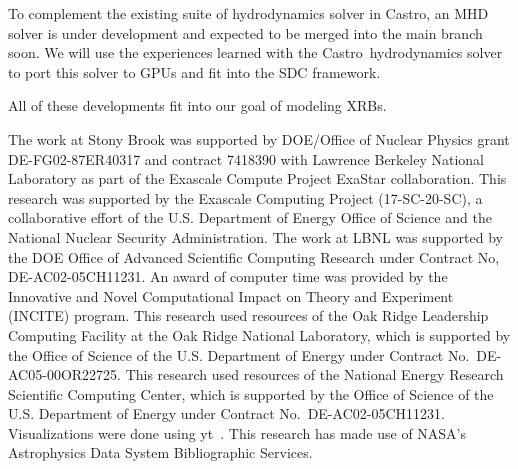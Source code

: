 \documentclass[a4paper]{jpconf}
\newcommand{\castro}{{\sffamily Castro}}
\begin{document}
To complement the existing suite of hydrodynamics solver in \castro,
an MHD solver is under development and expected to be merged into the
main branch soon.  We will use the experiences learned with the
\castro\ hydrodynamics solver to port this solver to GPUs and fit into
the SDC framework.

All of these developments fit into our goal of modeling XRBs.


\ack The work at Stony Brook was supported by DOE/Office of Nuclear
Physics grant DE-FG02-87ER40317 and contract 7418390 with Lawrence
Berkeley National Laboratory as part of the Exascale Compute Project
ExaStar collaboration.  This research was supported by the Exascale
Computing Project (17-SC-20-SC), a collaborative effort of the
U.S. Department of Energy Office of Science and the National Nuclear
Security Administration.  The work at LBNL was supported by the DOE
Office of Advanced Scientific Computing Research under Contract No,
DE-AC02-05CH11231.  An award of computer time was provided by the
Innovative and Novel Computational Impact on Theory and Experiment
(INCITE) program. This research used resources of the Oak Ridge
Leadership Computing Facility at the Oak Ridge National Laboratory,
which is supported by the Office of Science of the U.S. Department of
Energy under Contract No.\ DE-AC05-00OR22725.  This research used
resources of the National Energy Research Scientific Computing Center,
which is supported by the Office of Science of the U.S. Department of
Energy under Contract No.\ DE-AC02-05CH11231.  Visualizations were
done using yt~\cite{yt}.  This research has made use of NASA's
Astrophysics Data System Bibliographic Services.





\end{document}
